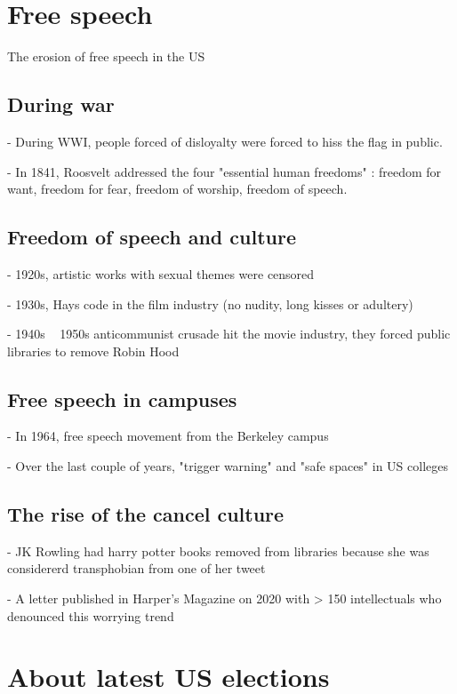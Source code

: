 \documentclass[10pt]{article}
\date{}
\begin{document}
    \section*{Free speech}

The erosion of free speech in the US

\subsection*{During war}

- During WWI, people forced of disloyalty were forced to hiss the flag in 
public.

- In 1841, Roosvelt addressed the four "essential human freedoms" : freedom for
 want, freedom for fear, freedom of worship, freedom of speech.

\subsection*{Freedom of speech and culture}

- 1920s, artistic works with sexual themes were censored

- 1930s, Hays code in the film industry (no nudity, long kisses or adultery)

- 1940s ~ 1950s anticommunist crusade hit the movie industry, they forced 
public libraries to remove Robin Hood

\subsection*{Free speech in campuses}

- In 1964, free speech movement from the Berkeley campus

- Over the last couple of years, "trigger warning" and "safe spaces" in US 
colleges

\subsection*{The rise of the cancel culture}

- JK Rowling had harry potter books removed from libraries because she was 
considererd transphobian from one of her tweet

- A letter published in Harper's Magazine on 2020 with > 150 intellectuals who 
denounced this worrying trend



\newpage

\section*{About latest US elections}
\end{document}
